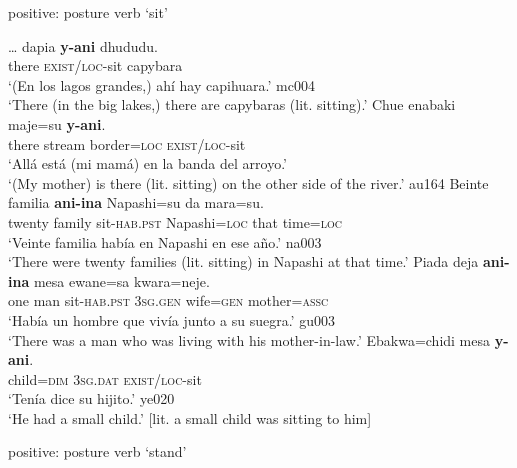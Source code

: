 \documentclass[output=paper]{langsci/langscibook}
\begin{document}
\begin{exe}\ex\label{ex:tacana-posture-sit} positive: posture verb `sit' 
\begin{xlist}
\ex\label{ex:tacana-posture-sit-capybaras}
\gll \ldots{}  dapia
\textbf{y-ani}
dhududu.\\
    {}  there  \textsc{exist/loc}-sit  capybara\\
\glt `(En los lagos grandes,) ahí hay capihuara.' mc004\\
`There (in the big lakes,) there are capybaras (lit. sitting).'
\ex\label{ex:tacana-posture-sit-mother}
\gll {}Chue
enabaki maje=su{\cb}
\textbf{y-ani}.\\
    there  stream  border=\textsc{loc}  \textsc{exist/loc}-sit\\
\glt `Allá está (mi mamá) en la banda del arroyo.'\\
`(My mother) is there (lit. sitting) on the other side of the river.' au164
\ex\label{ex:tacana-posture-sit-families}
\gll {}Beinte familia{\cb}
\textbf{ani-ina}
Napashi=su {\ob}da
mara=su{\cb}.\\
    twenty  family  sit-\textsc{hab.pst}
    Napashi=\textsc{loc}  that  time=\textsc{loc}\\
\glt `Veinte familia había en Napashi en ese año.' na003\\
`There were twenty families (lit. sitting) in Napashi at that time.'
\ex\label{ex:tacana-posture-sit-anoppi}
  \gll {}Piada deja{\cb} \textbf{ani-ina}
    mesa ewane=sa kwara=neje{\cb}.\\
    one  man  sit-\textsc{hab.pst}  \textsc{3sg.gen}
    wife=\textsc{gen}  mother=\textsc{assc}\\
\glt `Había un hombre que vivía junto a su suegra.' gu003\\
`There was a man who was living with his mother-in-law.'
\ex\label{ex:tacana-posture-sit-child}
  \gll  {}Ebakwa=chidi mesa
    \textbf{y-ani}.\\
  child=\textsc{dim}  \textsc{3sg.dat}  \textsc{exist/loc}-sit\\
\glt `Tenía dice su hijito.' ye020\\
`He had a small child.' [lit. a small child was sitting to him]
\end{xlist}
%
\ex\label{ex:tacana-posture-stand}  positive: posture verb `stand'\\

\end{exe}
\end{document}
